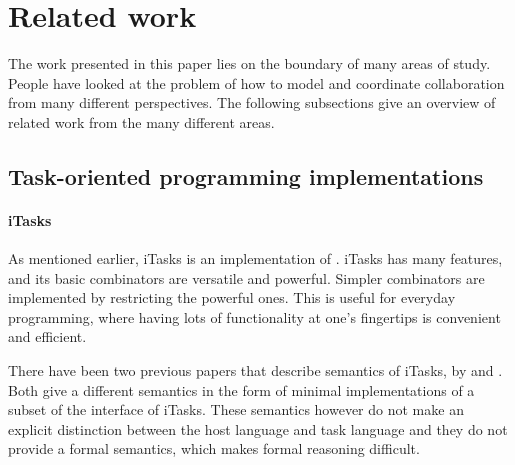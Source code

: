


\section{Related work}
\label{sec:relatedwork}

The work presented in this paper lies on the boundary of many areas of study.
People have looked at the problem of how to model and coordinate collaboration from many different perspectives.
The following subsections give an overview of related work from the many different areas.


\subsection{Task-oriented programming implementations}

\paragraph{iTasks}

As mentioned earlier, iTasks is an implementation of \TOP.
iTasks has many features, and its basic combinators are versatile and powerful.
Simpler combinators are implemented by restricting the powerful ones.
This is useful for everyday programming, where having lots of functionality at one's fingertips is convenient and efficient.

There have been two previous papers that describe semantics of iTasks, by \citet{conf/ifl/KoopmanPA08} and \citet{conf/ppdp/PlasmeijerLMAK12}.
Both give a different semantics in the form of minimal implementations of a subset of the interface of iTasks.
These semantics however do not make an explicit distinction between the host language and task language and they do not provide a formal semantics, which makes formal reasoning difficult.




